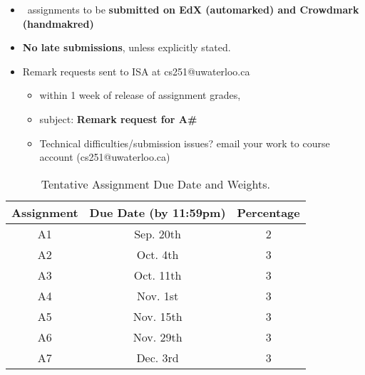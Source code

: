 \begin{frame}[fragile]
    \begin{itemize}
    \item \NumberAssignments~assignments to be \textbf{submitted on EdX (automarked) and Crowdmark (handmakred)}%
    \item \textbf{No late submissions}, unless explicitly stated.
    \item Remark requests sent to ISA at cs251@uwaterloo.ca 
    \begin{itemize}
    \item  within 1 week of release of assignment grades, 
    \item subject: \textbf{Remark request for A\#}  
     \item {\tiny Technical difficulties/submission issues? email your work to course account (cs251@uwaterloo.ca)}
    \end{itemize}
   
\end{itemize}
{\footnotesize
      \begin{table}[h!]
       \begin{center}
        \begin{tabular}{c|c|c}
             Assignment & Due Date (by 11:59pm) & Percentage  \\\hline\hline
             A1 & Sep. 20th& 2 \\
             A2 & Oct. 4th & 3\\
             A3 & Oct. 11th & 3\\
             A4 & Nov. 1st & 3\\\hline
             A5 & Nov. 15th & 3\\
             A6 & Nov. 29th & 3\\
             A7 & Dec. 3rd & 3\\
        \end{tabular} 
        \caption{Tentative Assignment Due Date and Weights.}
       \end{center}
        \end{table}

        
        }


\end{frame}



